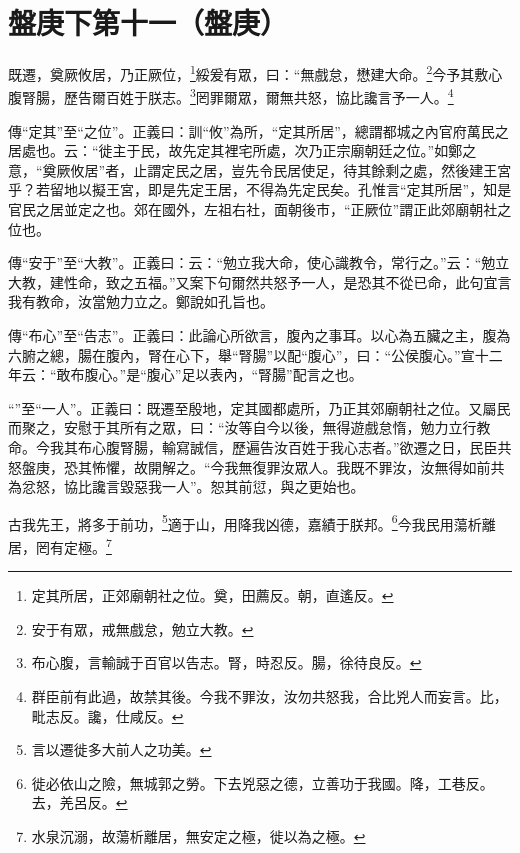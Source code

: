 \section{盤庚下第十一（盤庚）}

既遷，奠厥攸居，乃正厥位，\footnote{定其所居，正郊廟朝社之位。奠，田薦反。朝，直遙反。}綏爰有眾，曰：“無戲怠，懋建大命。\footnote{安于有眾，戒無戲怠，勉立大教。}今予其敷心腹腎腸，歷告爾百姓于朕志。\footnote{布心腹，言輸誠于百官以告志。腎，時忍反。腸，徐待良反。}罔罪爾眾，爾無共怒，協比讒言予一人。\footnote{群臣前有此過，故禁其後。今我不罪汝，汝勿共怒我，合比兇人而妄言。比，毗志反。讒，仕咸反。}

{\noindent\zhuan{}\fzbyks 傳“定其”至“之位”。正義曰：訓“攸”為所，“定其所居”，總謂都城之內官府萬民之居處也。云：“徙主于民，故先定其裡宅所處，次乃正宗廟朝廷之位。”如鄭之意，“奠厥攸居”者，止謂定民之居，豈先令民居使足，待其餘剩之處，然後建王宮乎？若留地以擬王宮，即是先定王居，不得為先定民矣。孔惟言“定其所居”，知是官民之居並定之也。郊在國外，左祖右社，面朝後市，“正厥位”謂正此郊廟朝社之位也。 \par}

{\noindent\zhuan{}\fzbyks 傳“安于”至“大教”。正義曰：云：“勉立我大命，使心識教令，常行之。”云：“勉立大教，建性命，致之五福。”又案下句爾然共怒予一人，是恐其不從已命，此句宜言我有教命，汝當勉力立之。鄭說如孔旨也。 \par}

{\noindent\zhuan{}\fzbyks 傳“布心”至“告志”。正義曰：此論心所欲言，腹內之事耳。以心為五臟之主，腹為六腑之總，腸在腹內，腎在心下，舉“腎腸”以配“腹心”，曰：“公侯腹心。”宣十二年云：“敢布腹心。”是“腹心”足以表內，“腎腸”配言之也。 \par}

{\noindent\shu{}\fzkt “”至“一人”。正義曰：既遷至殷地，定其國都處所，乃正其郊廟朝社之位。又屬民而聚之，安慰于其所有之眾，曰：“汝等自今以後，無得遊戲怠惰，勉力立行教命。今我其布心腹腎腸，輸寫誠信，歷遍告汝百姓于我心志者。”欲遷之日，民臣共怒盤庚，恐其怖懼，故開解之。“今我無復罪汝眾人。我既不罪汝，汝無得如前共為忿怒，協比讒言毀惡我一人”。恕其前愆，與之更始也。 \par}

古我先王，將多于前功，\footnote{言以遷徙多大前人之功美。}適于山，用降我凶德，嘉績于朕邦。\footnote{徙必依山之險，無城郭之勞。下去兇惡之德，立善功于我國。降，工巷反。去，羌呂反。}今我民用蕩析離居，罔有定極。\footnote{水泉沉溺，故蕩析離居，無安定之極，徙以為之極。}

